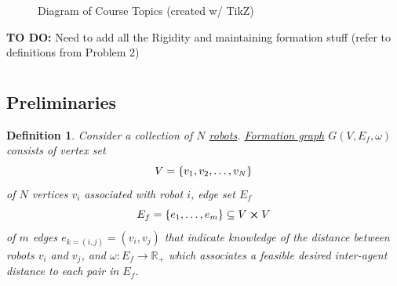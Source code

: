 \documentclass[]{article}
\numberwithin{equation}{section}
\newcommand{\R}{\mathbb{R}}
\newtheorem{definition}{Definition}
\begin{document}
\begin{figure}[h]
{}
	\caption{Diagram of Course Topics (created w/ TikZ)}
	\label{fig:pblm1}
\end{figure}

\textbf{TO DO:} 
Need to add all the Rigidity and maintaining formation stuff
(refer to definitions from Problem 2)

\newpage
\section{}
\subsection*{Preliminaries}

\begin{definition} \label{def:form_graph_def}
    Consider a collection of $N$ \underline{\emph{robots}}.
    \emph{\underline{Formation graph}} $G(V, E_f, \omega)$ consists of vertex set \[
        V = \qty{v_1,v_2,\dots,v_N}
    \] of $N$ vertices $v_i$ associated with robot $i$, edge set $E_f$\[
        E_f = \qty{e_1, \dots, e_m} \subseteq V \cross V
    \] of $m$ edges $e_{k=(i,j)} = (v_i,v_j)$ that indicate knowledge of the distance between robots $v_i$ and $v_j$, 
    and $\omega : E_f \to \R_{+}$ which associates a feasible desired inter-agent distance to each pair in $E_f$.
\end{definition}
\end{document}
